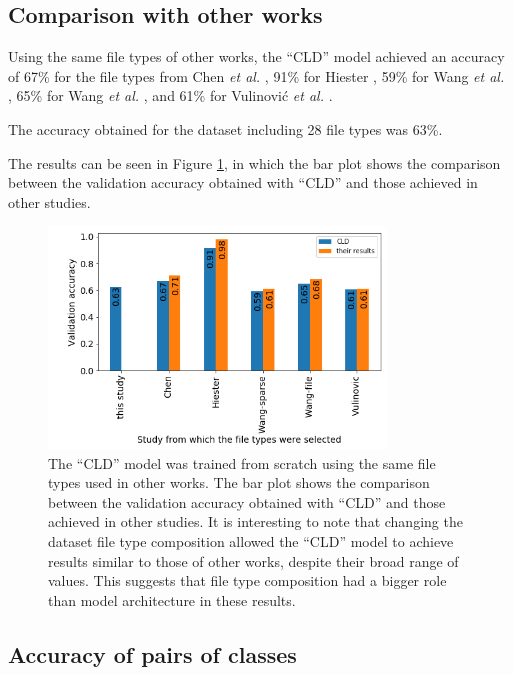 \subsection{Comparison with other works}

Using the same file types of other works, the ``CLD'' model achieved an accuracy of 
67\% for the file types from Chen \textit{et al.} \cite{chen_file_2018},
91\% for Hiester \cite{hiester_file_2018}, 
59\% for Wang \textit{et al.} \cite{wang_sparse_2018},
65\% for Wang \textit{et al.} \cite{wang_file_2018},
and
61\% for Vulinović \textit{et al.} \cite{vulinovic_neural_2019}.

The accuracy obtained for the dataset including 28 file types was 63\%.

The results can be seen in Figure \ref{fig:cldothers}, in which the bar plot shows the comparison between the validation accuracy obtained with ``CLD'' and those achieved in other studies.

\noindent
\begin{figure}[htb!]
\centering\includegraphics[width=0.8\textwidth]{CLD-others.png}
\caption[CLD vs. other studies]{\label{fig:cldothers}The ``CLD'' model was trained from scratch using the same file types used in other works. The bar plot shows the comparison between the validation accuracy obtained with ``CLD'' and those achieved in other studies. It is interesting to note that changing the dataset file type composition allowed the ``CLD'' model to achieve results similar to those of other works, despite their broad range of values. This suggests that file type composition had a bigger role than model architecture in these results.}%
\end{figure}

\subsection{Accuracy of pairs of classes}


